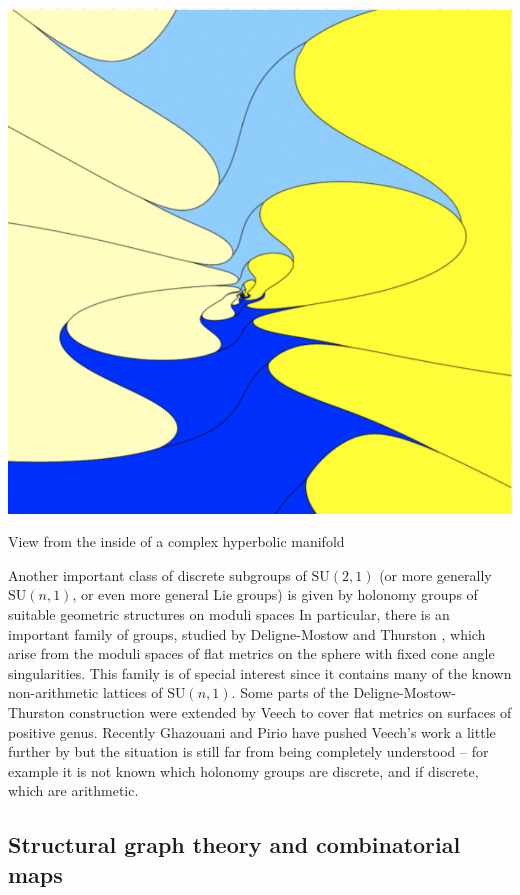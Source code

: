 \documentclass[14pt,fleqn]{article}
\begin{document}
\begin{center}
\includegraphics[scale=.13]{cplx_hyp.png} 

{\small View from the inside of a complex hyperbolic manifold}
\end{center}


Another important class of discrete subgroups of $\mathrm{SU}(2,1)$ (or more
generally $\mathrm{SU}(n,1)$, 
or even more general Lie groups) is given by
holonomy groups of suitable geometric structures on moduli spaces 
In particular,
there is an important family of groups,
studied by Deligne-Mostow \cite{delignemostow}   and Thurston \cite{thurstonshapes},
which arise from
the moduli spaces of flat metrics on the sphere with fixed cone angle singularities.
This family is of special interest 
since it contains many of the 
known non-arithmetic lattices of $\mathrm{SU}(n,1)$.
Some parts of the  Deligne-Mostow-Thurston construction 
were extended by 
Veech \cite{veech}  to cover flat metrics on surfaces of positive genus.
Recently Ghazouani and Pirio \cite{ghazouanipirio}
have  pushed Veech's work a little further by 
but
the situation is still far from being completely understood -- for example it is not known which
holonomy groups are discrete, and if discrete, which are arithmetic.



\subsection{Structural graph theory and combinatorial maps}
\end{document}

